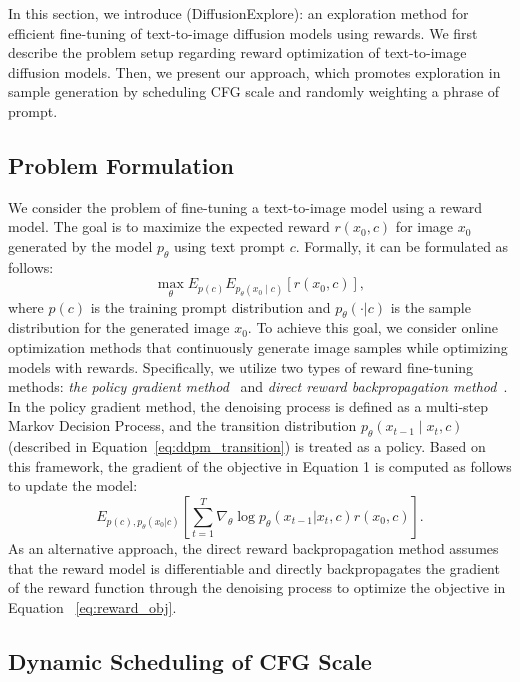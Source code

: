  In this section, we introduce \metabbr (DiffusionExplore): an exploration method for efficient fine-tuning of text-to-image diffusion models using rewards. We first describe the problem setup regarding reward optimization of text-to-image diffusion models. Then, we present our approach, which promotes exploration in sample generation by scheduling CFG scale and randomly weighting a phrase of prompt. 

\subsection{Problem Formulation}
\label{sec:method_formulation}

We consider the problem of fine-tuning a text-to-image model using a reward model. The goal is to maximize the expected reward $r(x_0, c)$ for image $x_0$ generated by the model $p_\theta$ using text prompt $c$. Formally, it can be formulated as follows:
\begin{equation}
  \max_\theta E_{p(c)} E_{p_\theta\left(x_0 \mid c\right)}\left[r(x_0, c)\right],
  \label{eq:reward_obj}
\end{equation}
where $p(c)$ is the training prompt distribution and $p_\theta(\cdot|c)$ is the sample distribution for the generated image $x_0$. To achieve this goal, we consider online optimization methods that continuously generate image samples while optimizing models with rewards. Specifically, we utilize two types of reward fine-tuning methods: {\em the policy gradient method}~\cite{dpok,ddpo} and {\em direct reward backpropagation method}~\cite{draft, alignprop}. In the policy gradient method, the denoising process is defined as a multi-step Markov Decision Process, and the transition distribution $p_\theta\left(x_{t-1} \mid x_{t},c\right)$ (described in Equation~\ref{eq:ddpm_transition}) is treated as a policy. Based on this framework, the gradient of the objective in Equation 1 is computed as follows to update the model:
\begin{equation}
E_{p(c),p_\theta(x_0|c)}\left[\sum_{t=1}^T \nabla_\theta \log p_\theta\left(x_{t-1}| x_t, c\right)r\left(x_0, c\right)\right].
    \label{eq:diffusion_policy}
\end{equation}
As an alternative approach, the direct reward backpropagation method assumes that the reward model is differentiable and directly backpropagates the gradient of the reward function through the denoising process to optimize the objective in Equation ~\ref{eq:reward_obj}. 


\subsection{Dynamic Scheduling of CFG Scale}

